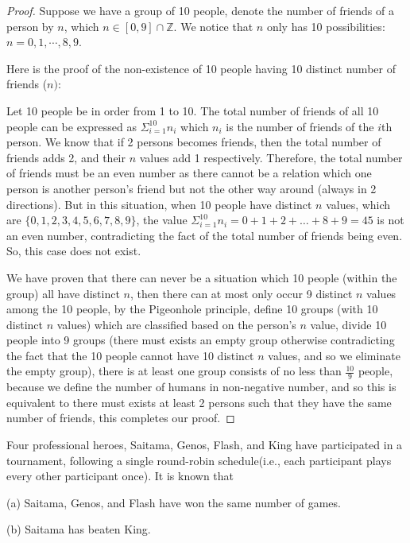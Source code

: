 \documentclass{homework}
\begin{document}
\begin{proof}
    Suppose we have a group of 10 people, denote the number of friends of a person by $n$, which $n\in[0,9]\cap\mathbb{Z}$. We notice that $n$ only has 10 possibilities: $n=0,1,\cdots,8,9$. 

    Here is the proof of the non-existence of 10 people having 10 distinct number of friends ($n)$:

    Let 10 people be in order from 1 to 10. The total number of friends of all 10 people can be expressed as $\Sigma_{i=1}^{10}n_i$ which $n_i$ is the number of friends of the $i$th person. We know that if 2 persons becomes friends, then the total number of friends adds 2, and their $n$ values add 1 respectively. Therefore, the total number of friends must be an even number as there cannot be a relation which one person is another person's friend but not the other way around (always in 2 directions). But in this situation, when 10 people have distinct $n$ values, which are $\{0,1,2,3,4,5,6,7,8,9\}$, the value $\Sigma_{i=1}^{10}n_i=0+1+2+\ldots+8+9=45$ is not an even number, contradicting the fact of the total number of friends being even. So, this case does not exist. 

    We have proven that there can never be a situation which 10 people (within the group) all have distinct $n$, then there can at most only occur 9 distinct $n$ values among the 10 people, by the Pigeonhole principle, define 10 groups (with 10 distinct $n$ values) which are classified based on the person's $n$ value, divide 10 people into 9 groups (there must exists an empty group otherwise contradicting the fact that the 10 people cannot have 10 distinct $n$ values, and so we eliminate the empty group), there is at least one group consists of no less than $\frac{10}9$ people, because we define the number of humans in non-negative number, and so this is equivalent to there must exists at least 2 persons such that they have the same number of friends, this completes our proof. 
\end{proof}

\newpage

\question Four professional heroes, Saitama, Genos, Flash, and King have participated in a tournament, following a single round-robin schedule(i.e., each participant plays every other participant once). It is known that

(a) Saitama, Genos, and Flash have won the same number of games.

(b) Saitama has beaten King.
\end{document}
